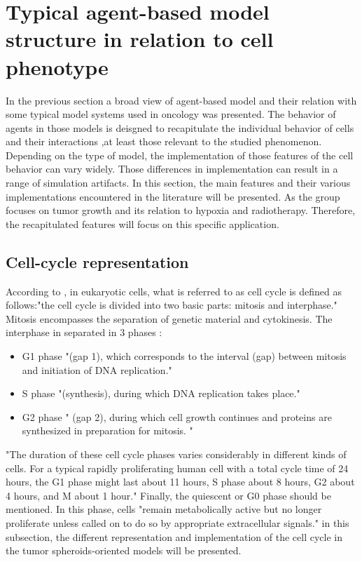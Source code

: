 \documentclass[11pt,a4paper]{article}
\begin{document}
\section{Typical agent-based model structure in relation to cell phenotype}
In the previous section a broad view of agent-based model and their relation with some typical model systems used in oncology was presented. The behavior of agents in those models is deisgned to recapitulate the individual behavior of cells and their interactions ,at least those relevant to the studied phenomenon. Depending on the type of model, the implementation of those features of the cell behavior can vary widely. Those differences in implementation can result in a range of simulation artifacts. In this section, the main features and their various implementations encountered in the literature will be presented. As the group focuses on tumor growth and its relation to hypoxia and radiotherapy.\cite{Rakotomalala2021}\cite{Goy2022} Therefore, the recapitulated features will focus on this specific application.

\subsection{Cell-cycle representation}
According to \cite{Cooper2000}, in eukaryotic cells, what is referred to as cell cycle is defined as follows:"the cell cycle is divided into two basic parts: mitosis and interphase."  Mitosis encompasses the separation of genetic material and cytokinesis. The interphase in separated in 3 phases :  
\begin{itemize}
\item{G1 phase} "(gap 1), which corresponds to the interval (gap) between mitosis and initiation of DNA replication."
\item{S phase}  "(synthesis), during which DNA replication takes place."
\item{G2 phase} " (gap 2), during which cell growth continues and proteins are synthesized in preparation for mitosis. "
\end{itemize}
"The duration of these cell cycle phases varies considerably in different kinds of cells. For a typical rapidly proliferating human cell with a total cycle time of 24 hours, the G1 phase might last about 11 hours, S phase about 8 hours, G2 about 4 hours, and M about 1 hour."\cite{Cooper2000} Finally, the quiescent or G0 phase should be mentioned. In this phase, cells "remain metabolically active but no longer proliferate unless called on to do so by appropriate extracellular signals." in this subsection, the different representation and implementation of the cell cycle in the tumor spheroids-oriented models will be presented.
\end{document}
